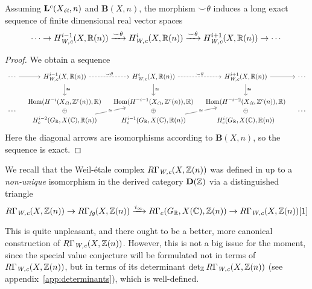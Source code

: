 \documentclass{article}
\numberwithin{equation}{section}
\begin{document}
\begin{lemma}
  \label{lemma:smile-theta}
  Assuming $\mathbf{L}^c (X_\et,n)$ and $\mathbf{B} (X,n)$, the morphism
  $\smile\theta$ induces a long exact sequence of finite dimensional real vector
  spaces
  \[ \cdots \to H^{i-1}_\Wc (X, \RR (n))
    \xrightarrow{\smile\theta}
    H^i_\Wc (X, \RR (n))
    \xrightarrow{\smile\theta}
    H^{i+1}_\Wc (X, \RR (n)) \to \cdots \]

  \begin{proof}
    We obtain a sequence
    \[ \begin{tikzcd}[column sep=1em]
        \cdots\ar{r} & H^{i-1}_\Wc (X, \RR(n)) \ar{d}{\cong}\ar[dashed]{r}{\smile\theta} & H^i_\Wc (X, \RR(n))\ar{d}{\cong}\ar[dashed]{r}{\smile\theta} & H^{i+1}_\Wc (X, \RR(n))\ar{d}{\cong} \ar{r} & \cdots \\
        & \Hom (H^{-i} (X_\et, \ZZ^c (n)), \RR) & \Hom (H^{-i-1} (X_\et, \ZZ^c (n)), \RR) & \Hom (H^{-i-2} (X_\et, \ZZ^c (n)), \RR) \\[-2em]
        \cdots & \oplus & \oplus & \oplus & \cdots \\[-2em]
        & H_c^{i-2} (G_\RR, X (\CC), \RR (n))\ar{uur}[description]{\cong} & H_c^{i-1} (G_\RR, X (\CC), \RR (n))\ar{uur}[description]{\cong} & H_c^i (G_\RR, X (\CC), \RR (n))
      \end{tikzcd} \]
    Here the diagonal arrows are isomorphisms according to $\mathbf{B} (X,n)$,
    so the sequence is exact.
  \end{proof}
\end{lemma}

We recall that the Weil-étale complex $R\Gamma_\Wc (X, \ZZ(n))$ was defined in
\cite{Beshenov-Weil-etale-1} up to a \emph{non-unique} isomorphism in the
derived category $\mathbf{D} (\ZZ)$ via a distinguished triangle
\begin{equation}
  \label{eqn:triangle-defining-RGamma-Wc}
  R\Gamma_\Wc (X, \ZZ(n)) \to R\Gamma_\fg (X,\ZZ(n)) \xrightarrow{i_\infty}
  R\Gamma_c (G_\RR, X (\CC), \ZZ (n)) \to R\Gamma_\Wc (X, \ZZ (n)) [1]
\end{equation}

This is quite unpleasant, and there ought to be a better, more canonical
construction of $R\Gamma_\Wc (X, \ZZ(n))$. However, this is not a big issue for
the moment, since the special value conjecture will be formulated not in terms
of $R\Gamma_\Wc (X, \ZZ (n))$, but in terms of its determinant
$\det_\ZZ R\Gamma_\Wc (X, \ZZ(n))$ (see appendix~\ref{app:determinants}), which
is well-defined.
\end{document}
